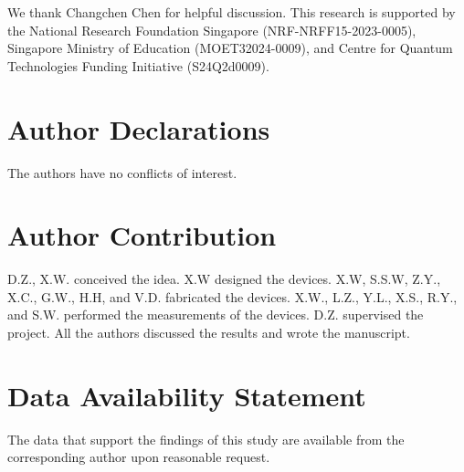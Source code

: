 \documentclass[aps, amsmath, amssymb,reprint,superscriptaddress]{revtex4-2}
\begin{document}
\begin{acknowledgments}
We thank Changchen Chen for helpful discussion. This research is supported by the National Research Foundation Singapore (NRF-NRFF15-2023-0005), Singapore Ministry of Education (MOET32024-0009), and Centre for Quantum Technologies Funding Initiative (S24Q2d0009).
\end{acknowledgments}
\section*{Author Declarations}
The authors have no conflicts of interest.

\section*{Author Contribution}
D.Z., X.W. conceived the idea. X.W designed the devices. X.W, S.S.W, Z.Y., X.C., G.W., H.H, and V.D. fabricated the devices. X.W., L.Z., Y.L., X.S., R.Y., and S.W. performed the measurements of the devices. D.Z. supervised the project. All the authors discussed the results and wrote the manuscript.

\section*{Data Availability Statement}
The data that support the findings of this study are available from the corresponding author upon reasonable request.









\end{document}
